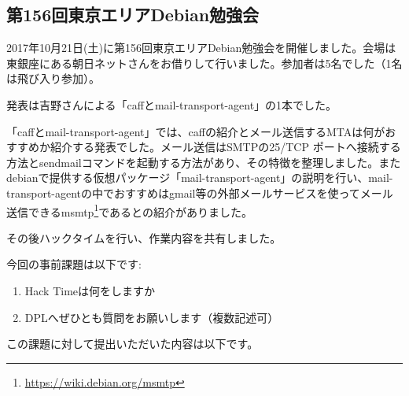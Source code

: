 \documentclass[mingoth,a4paper]{jsarticle}
\begin{document}

\subsection{第156回東京エリアDebian勉強会}

2017年10月21日(土)に第156回東京エリアDebian勉強会を開催しました。会場は東銀座にある朝日ネットさんをお借りして行いました。参加者は5名でした（1名は飛び入り参加）。

発表は吉野さんによる「caffとmail-transport-agent」の1本でした。

「caffとmail-transport-agent」では、caffの紹介とメール送信するMTAは何がおすすめか紹介する発表でした。メール送信はSMTPの25/TCP ポートへ接続する方法とsendmailコマンドを起動する方法があり、その特徴を整理しました。またdebianで提供する仮想パッケージ「mail-transport-agent」の説明を行い、mail-transport-agentの中でおすすめはgmail等の外部メールサービスを使ってメール送信できるmsmtp{\footnote{\url{https://wiki.debian.org/msmtp}}}であるとの紹介がありました。

その後ハックタイムを行い、作業内容を共有しました。



今回の事前課題は以下です:
\begin{enumerate}
\item Hack Timeは何をしますか
\item DPLへぜひとも質問をお願いします（複数記述可）
\end{enumerate}
この課題に対して提出いただいた内容は以下です。
\begin{multicols}{2}
{\small

}
\end{multicols}

%
%
%
%



\end{document}
